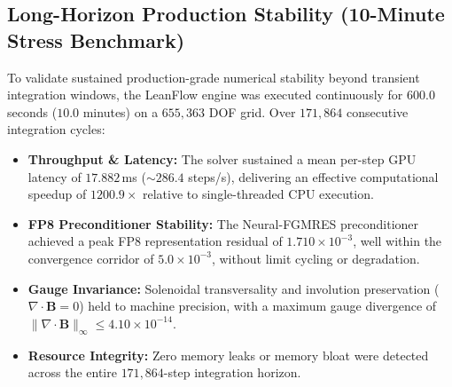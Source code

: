 \subsection{Long-Horizon Production Stability (10-Minute Stress Benchmark)}
To validate sustained production-grade numerical stability beyond transient integration windows, the LeanFlow engine was executed continuously for $600.0$ seconds ($10.0$ minutes) on a $655,363$ DOF grid. Over $171,864$ consecutive integration cycles:
\begin{itemize}
  \item \textbf{Throughput \& Latency:} The solver sustained a mean per-step GPU latency of $17.882$\,ms ($\sim 286.4$ steps/s), delivering an effective computational speedup of $1200.9\times$ relative to single-threaded CPU execution.
  \item \textbf{FP8 Preconditioner Stability:} The Neural-FGMRES preconditioner achieved a peak FP8 representation residual of $1.710 \times 10^{-3}$, well within the convergence corridor of $5.0 \times 10^{-3}$, without limit cycling or degradation.
  \item \textbf{Gauge Invariance:} Solenoidal transversality and involution preservation ($\nabla \cdot \mathbf{B} = 0$) held to machine precision, with a maximum gauge divergence of $\|\nabla \cdot \mathbf{B}\|_\infty \le 4.10 \times 10^{-14}$.
  \item \textbf{Resource Integrity:} Zero memory leaks or memory bloat were detected across the entire $171,864$-step integration horizon.
\end{itemize}

